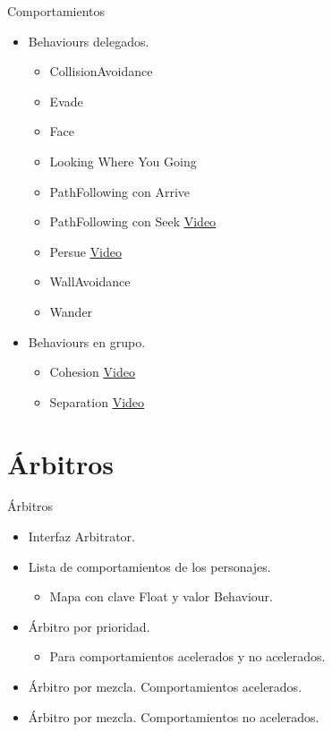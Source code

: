 \documentclass[10pt]{beamer}
\begin{document}
\begin{frame}{Comportamientos}
\begin{itemize}[<+- | alert@+>]
	\item Behaviours delegados.
 	\begin{itemize}[<+- | alert@+>]
  		\item CollisionAvoidance \item Evade \item Face \item Looking Where You Going \item PathFollowing con Arrive 
  		\item PathFollowing con Seek \href{videos/TestPathFollowingWithoutPathOffset.mp4}{\color{blue}\underline{Video}}
  		\item Persue \href{videos/TestPersue.mp4}{\color{blue}\underline{Video}}
  		\item WallAvoidance \item Wander 
 	\end{itemize}
 	\item Behaviours en grupo.
 	\begin{itemize}[<+- | alert@+>]
  		\item Cohesion \href{videos/TestCohesion.mp4}{\color{blue}\underline{Video}}
  		\item Separation \href{videos/TestSeparation.mp4}{\color{blue}\underline{Video}}
 	\end{itemize}
\end{itemize}
\end{frame}


\section{Árbitros}
\begin{frame}{Árbitros}
\begin{itemize}[<+- | alert@+>]
	\item Interfaz Arbitrator.
	\item Lista de comportamientos de los personajes.
	\begin{itemize}[<+- | alert@+>]
  		\item Mapa con clave Float y valor Behaviour.
 	\end{itemize}
	
	\item Árbitro por prioridad.
	\begin{itemize}[<+- | alert@+>]
  		\item Para comportamientos acelerados y no acelerados.
 	\end{itemize}
	\item Árbitro por mezcla. Comportamientos acelerados.
	\item Árbitro por mezcla. Comportamientos no acelerados.
\end{itemize}
\end{frame}
\end{document}
